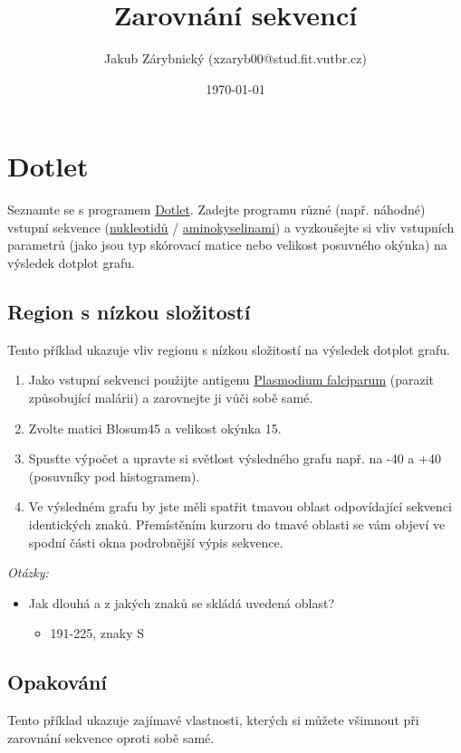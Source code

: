 \documentclass[11pt]{article}
\author{Jakub Zárybnický (xzaryb00@stud.fit.vutbr.cz)}
\date{\today}
\title{Zarovnání sekvencí}
\begin{document}
\maketitle
\tableofcontents


\section{Dotlet}
\label{sec:org8fee185}
Seznamte se s programem \href{https://dotlet.vital-it.ch/}{Dotlet}. Zadejte programu různé (např. náhodné) vstupní
sekvence (\href{http://www.bioinformatics.org/sms2/random\_dna.html}{nukleotidů} / \href{http://www.bioinformatics.org/sms2/random\_protein.html}{aminokyselinami}) a vyzkoušejte si vliv vstupních
parametrů (jako jsou typ skórovací matice nebo velikost posuvného okýnka) na
výsledek dotplot grafu.

\subsection{Region s nízkou složitostí}
\label{sec:orga6c95d3}
Tento příklad ukazuje vliv regionu s nízkou složitostí na výsledek dotplot
grafu.

\begin{enumerate}
\item Jako vstupní sekvenci použijte antigenu \href{data/dotlet\_lowcomp.txt}{Plasmodium falciparum} (parazit
způsobující malárii) a zarovnejte ji vůči sobě samé.
\item Zvolte matici Blosum45 a velikost okýnka 15.
\item Spusťte výpočet a upravte si světlost výsledného grafu např. na -40 a +40
(posuvníky pod histogramem).
\item Ve výsledném grafu by jste měli spatřit tmavou oblast odpovídající sekvenci
identických znaků. Přemístěním kurzoru do tmavé oblasti se vám objeví ve
spodní části okna podrobnější výpis sekvence.
\end{enumerate}

\emph{Otázky:}

\begin{itemize}
\item Jak dlouhá a z jakých znaků se skládá uvedená oblast?
\begin{itemize}
\item 191-225, znaky S
\end{itemize}
\end{itemize}

\subsection{Opakování}
\label{sec:orgf619ef6}
Tento příklad ukazuje zajímavé vlastnosti, kterých si můžete všimnout
při zarovnání sekvence oproti sobě samé.
\end{document}
